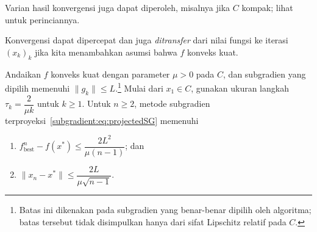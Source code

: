 Varian hasil konvergensi juga dapat diperoleh, misalnya jika \(C\) kompak; lihat~\cite{beck2017first} untuk perinciannya.

Konvergensi dapat dipercepat dan juga \emph{ditransfer} dari nilai fungsi ke iterasi \((x_k)_k\) jika kita menambahkan asumsi bahwa \(f\) konveks kuat.

\begin{theorem}
    Andaikan \(f\) konveks kuat dengan parameter \(\mu>0\) pada \(C\), dan subgradien yang dipilih memenuhi \(\|g_k\|\leq L\).\footnote{Batas ini dikenakan pada subgradien yang benar-benar dipilih oleh algoritma; batas tersebut tidak disimpulkan hanya dari sifat Lipschitz relatif pada \(C\).} Mulai dari \(x_1\in C\), gunakan ukuran langkah
    \(\tau_k = \dfrac{2}{\mu k}\) untuk \(k\geq1\). Untuk \(n\geq2\), metode subgradien terproyeksi~\eqref{subgradient:eq:projectedSG} memenuhi
    \begin{enumerate}
        \item \(f^n_{\mathrm{best}}-f(x^*)\leq \dfrac{2L^2}{\mu (n-1)}\); dan
        \item \(\|x_n-x^*\|\leq \dfrac{2L}{\mu \sqrt{n-1}}\).
    \end{enumerate}
\end{theorem}
